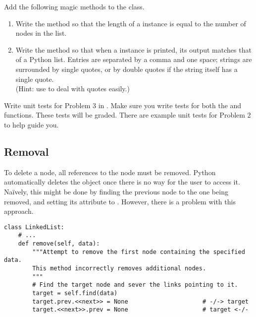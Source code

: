 \begin{problem} %
Add the following magic methods to the  class.
\begin{enumerate}
\item Write the  method so that the length of a  instance is equal to the number of nodes in the list.

\item Write the  method so that when a  instance is printed, its output matches that of a Python list.
Entries are separated by a comma and one space; strings are surrounded by single quotes, or by double quotes if the string itself has a single quote.
\\(Hint: use  to deal with quotes easily.)
\end{enumerate}
\end{problem}

\begin{unittest}
Write unit tests for Problem 3 in .
Make sure you write tests for both the   and  functions.
These tests will be graded.
There are example unit tests for Problem 2 to help guide you.
\end{unittest}

\subsection*{Removal} %

To delete a node, all references to the node must be removed.
Python automatically deletes the object once there is no way for the user to access it.
Na{\"i}vely, this might be done by finding the previous node to the one being removed, and setting its  attribute to .
However, there is a problem with this approach.

\begin{lstlisting}
class LinkedList:
    # ...
    def remove(self, data):
        """Attempt to remove the first node containing the specified data.
        This method incorrectly removes additional nodes.
        """
        # Find the target node and sever the links pointing to it.
        target = self.find(data)
        target.prev.<<next>> = None                     # -/-> target
        target.<<next>>.prev = None                     # target <-/-
\end{lstlisting}


